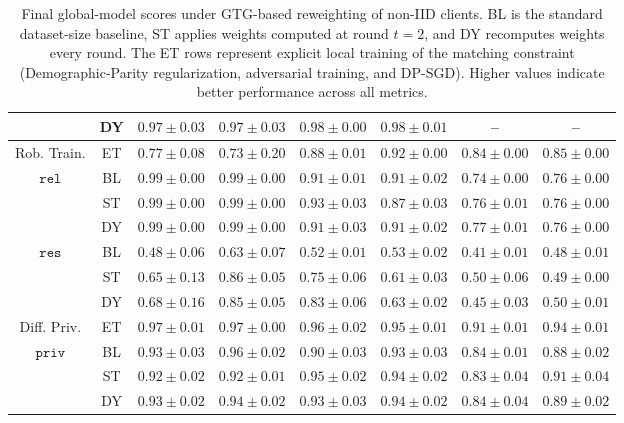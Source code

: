 \documentclass[acmsmall]{acmart}
\begin{document}
\begin{table}[!t]
{\begin{tabular}{cc||cc|cc|cc|}
    & DY & $0.97 \pm 0.03$ & $0.97 \pm 0.03$ & $0.98 \pm 0.00$ & $0.98 \pm 0.01$ & -- & -- \\
    \hline\hline
    Rob. Train.& ET & $0.77 \pm 0.08$ & $0.73 \pm 0.20$ & $0.88 \pm 0.01$ & $0.92 \pm 0.00$ & $0.84 \pm 0.00$ & $0.85 \pm 0.00$ \\
    \hline
    \multirow{3}{*}{$\mathtt{rel}$}
    & BL & $0.99 \pm 0.00$ & $0.99 \pm 0.00$ & $0.91 \pm 0.01$ & $0.91 \pm 0.02$ & $0.74 \pm 0.00$ & $0.76 \pm 0.00$ \\
    & ST & $0.99 \pm 0.00$ & $0.99 \pm 0.00$ & $0.93 \pm 0.03$ & $0.87 \pm 0.03$ & $0.76 \pm 0.01$ & $0.76 \pm 0.00$ \\
    & DY & $0.99 \pm 0.00$ & $0.99 \pm 0.00$ & $0.91 \pm 0.03$ & $0.91 \pm 0.02$ & $0.77 \pm 0.01$ & $0.76 \pm 0.00$ \\
    \hline
    \multirow{3}{*}{$\mathtt{res}$}
    & BL & $0.48 \pm 0.06$ & $0.63 \pm 0.07$ & $0.52 \pm 0.01$ & $0.53 \pm 0.02$ & $0.41 \pm 0.01$ & $0.48 \pm 0.01$ \\
    & ST & $0.65 \pm 0.13$ & $0.86 \pm 0.05$ & $0.75 \pm 0.06$ & $0.61 \pm 0.03$ & $0.50 \pm 0.06$ & $0.49 \pm 0.00$ \\
    & DY & $0.68 \pm 0.16$ & $0.85 \pm 0.05$ & $0.83 \pm 0.06$ & $0.63 \pm 0.02$ & $0.45 \pm 0.03$ & $0.50 \pm 0.01$ \\
    \hline\hline
    Diff. Priv.& ET & $0.97 \pm 0.01$ & $0.97 \pm 0.00$ & $0.96 \pm 0.02$ & $0.95 \pm 0.01$ & $0.91 \pm 0.01$ & $0.94 \pm 0.01$ \\
    \hline
    \multirow{3}{*}{$\mathtt{priv}$}
    & BL & $0.93 \pm 0.03$ & $0.96 \pm 0.02$ & $0.90 \pm 0.03$ & $0.93 \pm 0.03$ & $0.84 \pm 0.01$ & $0.88 \pm 0.02$ \\
    & ST & $0.92 \pm 0.02$ & $0.92 \pm 0.01$ & $0.95 \pm 0.02$ & $0.94 \pm 0.02$ & $0.83 \pm 0.04$ & $0.91 \pm 0.04$ \\
    & DY & $0.93 \pm 0.02$ & $0.94 \pm 0.02$ & $0.93 \pm 0.03$ & $0.94 \pm 0.02$ & $0.84 \pm 0.04$ & $0.89 \pm 0.02$ \\
    \hline
    \end{tabular}    }
    \caption{Final global-model scores under GTG-based reweighting of non-IID clients. BL is the standard dataset-size baseline, ST applies weights computed at round $t=2$, and DY recomputes weights every round. The ET rows represent explicit local training of the matching constraint (Demographic-Parity regularization, adversarial training, and DP-SGD). Higher values indicate better performance across all metrics.}
    \label{tab:util}
\end{table}
\end{document}
